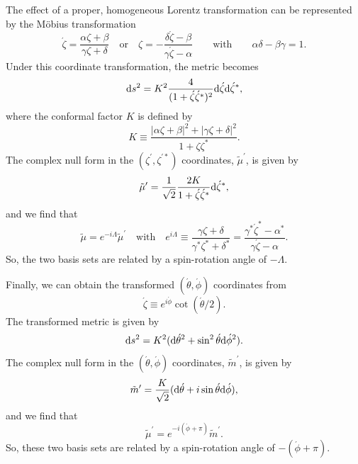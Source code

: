 \documentclass[11pt]{article}
\begin{document}
The effect of a proper, homogeneous Lorentz transformation can be
represented by the M\"{o}bius transformation
\begin{equation}\label{eq:Mobius-def}
  \acute\zeta = \frac{\alpha\zeta+\beta}{\gamma\zeta+\delta}
\quad\mbox{or}\quad
  \zeta = -\frac{\delta\acute\zeta-\beta}{\gamma\acute\zeta-\alpha}
\qquad\mbox{with}\qquad
\alpha\delta-\beta\gamma=1.
\end{equation}
Under this coordinate transformation, the metric becomes
\begin{equation}
  {\rm d}s^2 = K^2\frac4{(1+\acute\zeta\acute\zeta^*)^2}
              {\rm d}\acute\zeta{\rm d}\acute\zeta^*,
\end{equation}
where the conformal factor $K$ is defined by
\begin{equation}
  K\equiv \frac{|\alpha\zeta+\beta|^2+|\gamma\zeta+\delta|^2}{1+\zeta\zeta^*}.
\end{equation}
The complex null form in the $(\zeta^\prime,\zeta^{\prime*})$ coordinates,
$\tilde\mu^\prime$, is given by
\begin{equation}
  \tilde\mu^\prime = \frac1{\sqrt2}\frac{2K}{1+\acute\zeta\acute\zeta^*}
           {\rm d}\acute\zeta^*,
\end{equation}
and we find that
\begin{equation}
  \tilde\mu = e^{-i\Lambda}\tilde\mu^\prime
\quad\mbox{with}\quad e^{i\Lambda}\equiv 
   \frac{\gamma\zeta+\delta}{\gamma^*\zeta^*+\delta^*} =
   \frac{\gamma^*\acute\zeta^*-\alpha^*}{\gamma\acute\zeta-\alpha}.
\end{equation}
So, the two basis sets are related by a spin-rotation angle of $-\Lambda$.

Finally, we can obtain the transformed $(\acute\theta,\acute\phi)$
coordinates from
\begin{equation}
  \acute\zeta\equiv e^{i\acute\phi}\cot(\acute\theta/2).
\end{equation}
The transformed metric is given by
\begin{equation}
{\rm d}s^2 = K^2({\rm d}\acute\theta^2+\sin^2\acute\theta{\rm d}\acute\phi^2).
\end{equation}
The complex null form in the $(\acute\theta,\acute\phi)$ coordinates,
$\tilde{m}^\prime$, is given by
\begin{equation}
\tilde{m}^\prime = \frac{K}{\sqrt2}
      ({\rm d}\acute\theta+i\sin\acute\theta{\rm d}\acute\phi),
\end{equation}
and we find that
\begin{equation}
\tilde\mu^\prime = e^{-i(\acute\phi+\pi)}\tilde{m}^\prime.
\end{equation}
So, these two basis sets are related by a spin-rotation angle of
$-(\acute\phi+\pi)$.
\end{document}
